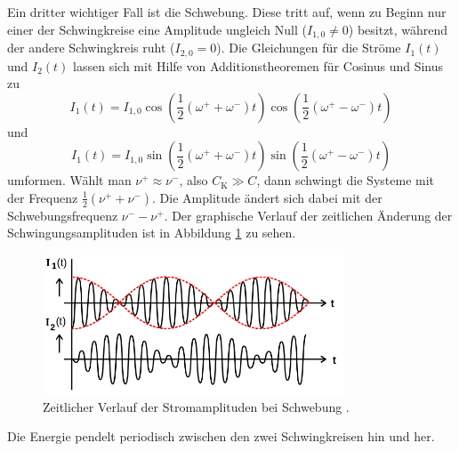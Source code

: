 Ein dritter wichtiger Fall ist die Schwebung. Diese tritt auf, wenn zu Beginn
nur einer der Schwingkreise eine Amplitude ungleich Null ($I_{1,0} \neq 0$)
besitzt, während der andere Schwingkreis ruht ($I_{2,0} = 0$). Die Gleichungen
für die Ströme $I_1(t)$ und $I_2(t)$ lassen sich mit Hilfe von Additionstheoremen
für Cosinus und Sinus zu
\begin{equation}
  I_1(t) = I_{1,0} \cos\left(\frac{1}{2}(\omega^{+}+\omega^{-})t\right)
  \cos\left(\frac{1}{2}(\omega^{+}-\omega^{-})t\right)
  \label{eqn:schwebung_I1}
\end{equation}
und
\begin{equation}
  I_1(t) = I_{1,0} \sin\left(\frac{1}{2}(\omega^{+}+\omega^{-})t\right)
  \sin\left(\frac{1}{2}(\omega^{+}-\omega^{-})t\right)
  \label{eqn:schwebung_I2}
\end{equation}
umformen.
Wählt man $\nu^{+} \approx \nu^{-}$, also $C_\text{K} \gg C$, dann schwingt die
Systeme mit der Frequenz $\frac{1}{2}(\nu^{+} + \nu^{-})$. Die Amplitude ändert
sich dabei mit der Schwebungsfrequenz $\nu^{-} - \nu^{+}$. Der graphische Verlauf
der zeitlichen Änderung der Schwingungsamplituden ist in Abbildung \ref{fig:schwebung}
zu sehen.
\begin{figure}[H]
  \centering
  \includegraphics[width=0.8\textwidth]{schwebung.png}
  \caption{Zeitlicher Verlauf der Stromamplituden bei Schwebung \cite{sample}.}
  \label{fig:schwebung}
\end{figure}
Die Energie pendelt periodisch zwischen den zwei Schwingkreisen hin und her.

